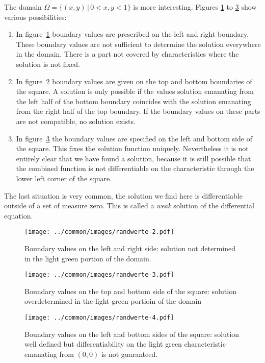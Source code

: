 The domain $\Omega=\{(x,y)\,|\,0<x,y<1\}$ is more interesting.
Figures \ref{geometrie:charrand1}
to \ref{geometrie:charrand3}
show various possibilities:
\begin{enumerate}
\item
In figure~\ref{geometrie:charrand1}
boundary values are prescribed on the left and right boundary.
These boundary values are not sufficient to determine the solution
everywhere in the domain.
There is a part not covered by characteristics where the solution
is not fixed.
\item
In figure~\ref{geometrie:charrand2}
boundary values are given on the top and bottom boundaries of the
square.
A solution is only possible if the values solution emanating from
the left half of the bottom boundary coincides with the solution
emanating from the right half of the top boundary.
If the boundary values on these parts are not compatible, no solution
exists.
\item
In figure~\ref{geometrie:charrand3}
the boundary values are specified on the left and bottom side
of the square.
This fixes the solution function uniquely.
Nevertheless it is not entirely clear that we have found a solution,
because it is still possible that the combined function is not
differentiable on the characteristic through the lower left
corner of the square.
\end{enumerate}
The last situation is very common, the solution we find here is
differentiable outside of a set of measure zero.
This is called a {\em weak} solution of the differential equation.

\begin{figure}
\begin{center}
\texttt{[image: ../common/images/randwerte-2.pdf]}
\end{center}
\caption{Boundary values on the left and right side: solution
not determined in the light green portion of the domain.
\label{geometrie:charrand1}}
\end{figure}

\begin{figure}
\begin{center}
\texttt{[image: ../common/images/randwerte-3.pdf]}
\end{center}
\caption{Boundary values on the top and bottom side of the square:
solution overdetermined in the light green portioin of the domain
\label{geometrie:charrand2}}
\end{figure}

\begin{figure}
\begin{center}
\texttt{[image: ../common/images/randwerte-4.pdf]}
\end{center}
\caption{Boundary values on the left and bottom sides of the square:
solution well defined but differentiability on the light green
characteristic emanating from $(0,0)$ is not guaranteed.
\label{geometrie:charrand3}}
\end{figure}

